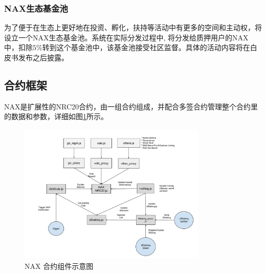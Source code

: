\subsubsection{NAX生态基金池}
为了便于在生态上更好地在投资、孵化，扶持等活动中有更多的空间和主动权，将设立一个NAX生态基金池。系统在实际分发过程中, 将分发给质押用户的NAX中，扣除$5\%$转到这个基金池中，该基金池接受社区监督。具体的活动内容将在白皮书发布之后披露。

\subsection{合约框架}
NAX是扩展性的NRC20合约，由一组合约组成，并配合多签合约管理整个合约里的数据和参数，详细如图\ref{fig:nax_framework}所示。

\begin{figure}[h]
  \centering
  \includegraphics[width=0.8\textwidth]{../common/nax.pdf}
  \caption{NAX 合约组件示意图 \label{fig:nax_framework}}
\end{figure}

